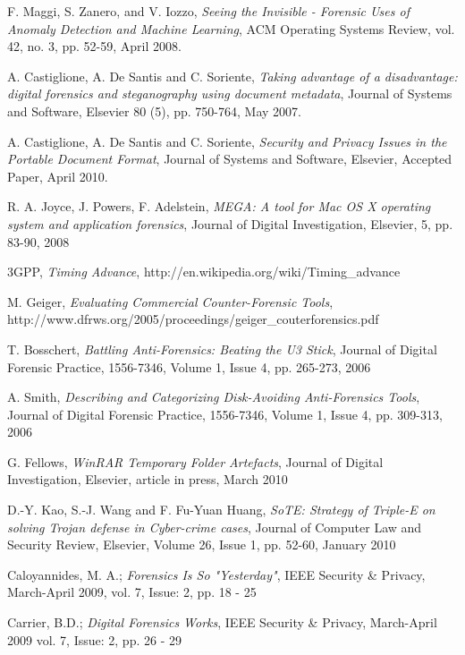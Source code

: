 \documentclass[runningheads,english]{llncs}
\begin{document}
{\begin{thebibliography}{1}
F. Maggi, S. Zanero, and V. Iozzo, \emph{Seeing the Invisible - Forensic Uses of
Anomaly Detection and Machine Learning}, ACM Operating Systems Review, vol. 42,
no. 3, pp. 52-59, April 2008.

A. Castiglione, A. De Santis and C. Soriente, \emph{Taking advantage of a
disadvantage: digital forensics and steganography using document metadata},
Journal of Systems and Software, Elsevier 80 (5), pp. 750-764, May 2007.

A. Castiglione, A. De Santis and C. Soriente, \emph{Security and Privacy Issues
in the Portable Document Format}, Journal of Systems and Software, Elsevier,
Accepted Paper, April 2010.

R. A. Joyce, J. Powers, F. Adelstein, \emph{MEGA: A tool for Mac OS X operating
system and application forensics}, Journal of Digital Investigation, Elsevier,
5, pp. 83-90, 2008

3GPP, \emph{Timing Advance}, http://en.wikipedia.org/wiki/Timing\_advance

M. Geiger, \emph{Evaluating Commercial Counter-Forensic Tools},
http://www.dfrws.org/2005/proceedings/geiger\_couterforensics.pdf

T. Bosschert, \emph{Battling Anti-Forensics: Beating the U3 Stick}, Journal of
Digital Forensic Practice, 1556-7346, Volume 1, Issue 4, pp. 265-273, 2006

A. Smith, \emph{Describing and Categorizing Disk-Avoiding Anti-Forensics Tools},
Journal of Digital Forensic Practice, 1556-7346, Volume 1, Issue 4, pp. 309-313,
2006

G. Fellows, \emph{WinRAR Temporary Folder Artefacts}, Journal of Digital
Investigation, Elsevier, article in press, March 2010

D.-Y. Kao, S.-J. Wang and F. Fu-Yuan Huang, \emph{SoTE: Strategy of Triple-E on
solving Trojan defense in Cyber-crime cases}, Journal of Computer Law and
Security Review, Elsevier, Volume 26, Issue 1, pp. 52-60, January 2010

Caloyannides, M. A.; \emph{Forensics Is So "Yesterday"}, IEEE Security \&
Privacy, March-April 2009,  vol. 7, Issue: 2, pp. 18 - 25 

Carrier, B.D.;  \emph{Digital Forensics Works}, IEEE Security \& Privacy,
March-April 2009 
vol. 7, Issue: 2, pp. 26 - 29


\end{thebibliography}}
\end{document}
